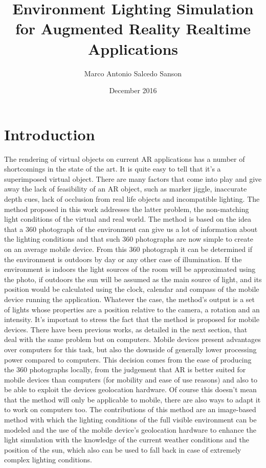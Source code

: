 \documentclass{article}
\title{Environment Lighting Simulation for Augmented Reality Realtime Applications}
\author{Marco Antonio Salcedo Sanson }
\date{December 2016}
\begin{document}
\maketitle

\section{Introduction}
The rendering of virtual objects on current AR applications has a number of shortcomings in the state of the art. It is quite easy to tell that it’s a superimposed virtual object. There are many factors that come into play and give away the lack of feasibility of an AR object, such as marker jiggle, inaccurate depth cues, lack of occlusion from real life objects and incompatible lighting.
The method proposed in this work addresses the latter problem, the non-matching light conditions of the virtual and real world. The method is based on the idea that a 360 photograph of the environment can give us a lot of information about the lighting conditions and that such 360 photographs are now simple to create on an average mobile device. From this 360 photograph it can be determined if the environment is outdoors by day or any other case of illumination. If the environment is indoors the light sources of the room will be approximated using the photo, if outdoors the sun will be assumed as the main source of light, and its position would be calculated using the clock, calendar and compass of the mobile device running the application. 
Whatever the case, the method's output is a set of lights whose properties are a position relative to the camera, a rotation and an intensity.
It's important to stress the fact that the method is proposed for mobile devices. There have been previous works, as detailed in the next section, that deal with the same problem but on computers. Mobile devices present advantages over computers for this task, but also the downside of generally lower processing power compared to computers. This decision comes from the ease of producing the 360 photographs locally, from the judgement that AR is better suited for mobile devices than computers (for mobility and ease of use reasons) and also to be able to exploit the devices geolocation hardware. Of course this doesn't mean that the method will only be applicable to mobile, there are also ways to adapt it to work on computers too.
The contributions of this method are an image-based method with which the lighting conditions of the full visible environment can be modeled and the use of the mobile device's geolocation hardware to enhance the light simulation with the knowledge of the current weather conditions and the position of the sun, which also can be used to fall back in case of extremely complex lighting conditions.
\end{document}
